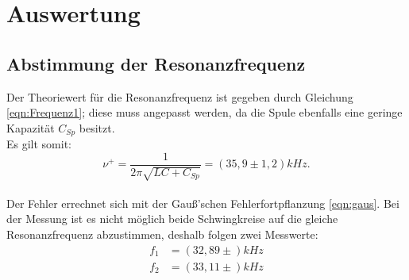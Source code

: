 \newpage
\section{Auswertung}
\label{sec:Auswertung}
\subsection{Abstimmung der Resonanzfrequenz}
Der Theoriewert für die Resonanzfrequenz ist gegeben durch Gleichung \eqref{eqn:Frequenz1};
diese muss angepasst werden, da die Spule ebenfalls eine geringe Kapazität $C_{Sp}$ besitzt.\\
Es gilt somit:\\
\begin{equation}
  \nu^{+}=\frac{1}{2\pi\sqrt{LC+C_{Sp}}}=(35,9\pm 1,2)kHz.
\end{equation}\\
Der Fehler errechnet sich mit der Gauß'schen Fehlerfortpflanzung \eqref{eqn:gaus}.
Bei der Messung ist es nicht möglich beide Schwingkreise auf die gleiche Resonanzfrequenz abzustimmen, deshalb folgen zwei Messwerte:
\begin{align}
f_1&=(32,89 \pm )kHz\\
f_2&=(33,11 \pm )kHz
\end{align}

